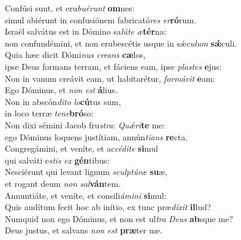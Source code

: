 \evenverse Confúsi sunt, et eru\textit{bu}\textit{é}\textit{runt} \textbf{om}nes:~\*\\
\evenverse simul abiérunt in confusiónem fabricató\textit{res} \textit{er}\textbf{ró}rum.\\
\oddverse Israël salvátus est in Dómino sa\textit{lú}\textit{te} \textit{æ}\textbf{tér}na:~\*\\
\oddverse non confundémini, et non erubescétis usque in sǽ\textit{cu}\textit{lum} \textbf{sǽ}culi.\\
\evenverse Quia hæc dicit Dómi\textit{nus} \textit{cre}\textit{ans} \textbf{cæ}los,~\*\\
\evenverse ipse Deus formans terram, et fáciens eam, ipse \textit{pla}\textit{stes} \textbf{e}jus:\\
\oddverse Non in vanum creávit eam, ut habitarétur, \textit{for}\textit{má}\textit{vit} \textbf{e}am:~\*\\
\oddverse Ego Dóminus, et \textit{non} \textit{est} \textbf{á}lius.\\
\evenverse Non in abscón\textit{di}\textit{to} \textit{lo}\textbf{cú}tus sum,~\*\\
\evenverse in loco terræ \textit{te}\textit{ne}\textbf{bró}so:\\
\oddverse Non dixi sémini Jacob fru\textit{stra}: \textit{Quǽ}\textit{ri}\textbf{te} me:~\*\\
\oddverse ego Dóminus loquens justítiam, annún\textit{ti}\textit{ans} \textbf{re}cta.\\
\evenverse Congregámini, et veníte, et ac\textit{cé}\textit{di}\textit{te} \textbf{si}mul~\*\\
\evenverse qui salváti e\textit{stis} \textit{ex} \textbf{gén}tibus:\\
\oddverse Nesciérunt qui levant lignum \textit{scul}\textit{ptú}\textit{ræ} \textbf{su}æ,~\*\\
\oddverse et rogant deum \textit{non} \textit{sal}\textbf{ván}tem.\\
\evenverse Annuntiáte, et veníte, et consili\textit{á}\textit{mi}\textit{ni} \textbf{si}mul:~\*\\
\evenverse Quis audítum fecit hoc ab inítio, ex tunc præ\textit{dí}\textit{xit} \textbf{il}lud?\\
\oddverse Numquid non ego Dóminus, et non est ul\textit{tra} \textit{De}\textit{us} \textbf{ab}sque me?~\*\\
\oddverse Deus justus, et salvans \textit{non} \textit{est} \textbf{præ}ter me.\\
